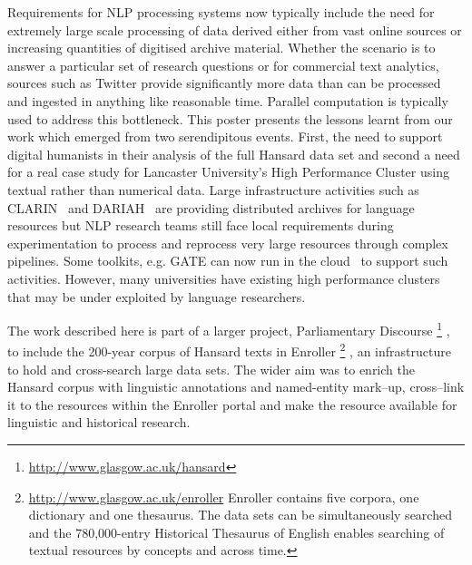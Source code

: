 Requirements for NLP processing systems now typically include the need for extremely large scale processing of data derived either from vast online sources or increasing quantities of digitised archive material. 
Whether the scenario is to answer a particular set of research questions or for commercial text analytics, sources such as Twitter provide significantly more data than can be processed and ingested in anything like reasonable time. Parallel computation is typically used to address this bottleneck. 
This poster presents the lessons learnt from our work which emerged from two serendipitous events. First, the need to support digital humanists in their analysis of the full Hansard data set and second a need for a real case study for Lancaster University's High Performance Cluster using textual rather than numerical data. Large infrastructure activities such as CLARIN~\cite{varadi2008clarin} and DARIAH~\cite{constantopoulos2008preparing} are providing distributed archives for language resources but NLP research teams still face local requirements during experimentation to process and reprocess very large resources through complex pipelines. Some toolkits, e.g. GATE can now run in the cloud~\cite{tablan2013gatecloud} to support such activities. However, many universities have existing high performance clusters that may be under exploited by language researchers.  

The work described here is part of a larger project, Parliamentary Discourse%
\footnote{\url{http://www.glasgow.ac.uk/hansard}}%
, to include the 200-year corpus of Hansard texts in Enroller%
\footnote{\url{http://www.glasgow.ac.uk/enroller} Enroller contains five corpora, one dictionary and one thesaurus. The data sets can be simultaneously searched and the 780,000-entry Historical Thesaurus of English enables searching of textual resources by concepts and across time.}%
, an infrastructure to hold and cross-search large data sets. The wider aim was to enrich the Hansard corpus with linguistic annotations and named-entity mark--up, cross--link it to the resources within the Enroller portal and make the resource available for linguistic and historical research. 


